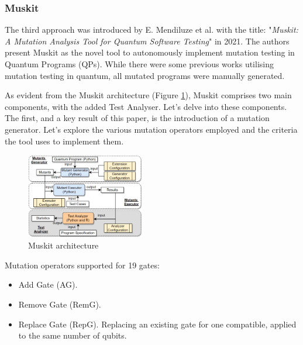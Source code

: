 \begin{itemize}
\vspace{15pt}
\subsubsection{Muskit}
\label{Ch2.3.2:Muskit}
The third approach was introduced by E. Mendiluze et al. with the title: "\textit{Muskit: A Mutation Analysis Tool for Quantum Software Testing}"\cite{mendiluze2021muskit} in 2021. The authors present Muskit as the novel tool to autonomously implement mutation testing in Quantum Programs (QPs). While there were some previous works\cite{ali2021assessing}\cite{wang2021quito} utilising mutation testing in quantum, all mutated programs were manually generated.\newline

As evident from the Muskit architecture (Figure \ref{Fig:MuskitArch}), Muskit comprises two main components, with the added Test Analyser. Let's delve into these components. The first, and a key result of this paper, is the introduction of a mutation generator. Let's explore the various mutation operators employed and the criteria the tool uses to implement them.

\begin{figure}[H]
        \centering
        \includegraphics[width=0.46\textwidth]{TFM/photos/MuskitOverview.png}
        \caption{Muskit architecture \cite{mendiluze2021muskit}} 
        \label{Fig:MuskitArch}
\end{figure}

Mutation operators supported for 19 gates:
\begin{itemize}
    \item Add Gate (AG).
    \item Remove Gate (RemG).
    \item Replace Gate (RepG). Replacing an existing gate for one compatible, applied to the same number of qubits.
\end{itemize}


\end{itemize}
